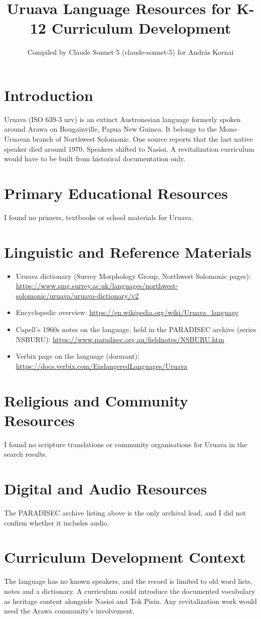 \documentclass[12pt]{article}
\title{Uruava Language Resources for K-12 Curriculum Development}
\author{Compiled by Claude Sonnet 5 (claude-sonnet-5) for Andr\'as Kornai}
\date{}
\begin{document}
\maketitle

\section{Introduction}
Uruava (ISO 639-3 urv) is an extinct Austronesian language formerly spoken around Arawa on Bougainville, Papua New Guinea. It belongs to the Mono--Uruavan branch of Northwest Solomonic. One source reports that the last native speaker died around 1970. Speakers shifted to Nasioi. A revitalization curriculum would have to be built from historical documentation only.

\section{Primary Educational Resources}
I found no primers, textbooks or school materials for Uruava.

\section{Linguistic and Reference Materials}
\begin{itemize}
\item Uruava dictionary (Surrey Morphology Group, Northwest Solomonic pages): \url{https://www.smg.surrey.ac.uk/languages/northwest-solomonic/uruava/uruava-dictionary/v2}
\item Encyclopedic overview: \url{https://en.wikipedia.org/wiki/Uruava_language}
\item Capell's 1960s notes on the language, held in the PARADISEC archive (series NSBURU): \url{https://www.paradisec.org.au/fieldnotes/NSBURU.htm}
\item Verbix page on the language (dormant): \url{https://docs.verbix.com/EndangeredLanguages/Uruava}
\end{itemize}

\section{Religious and Community Resources}
I found no scripture translations or community organisations for Uruava in the search results.

\section{Digital and Audio Resources}
The PARADISEC archive listing above is the only archival lead, and I did not confirm whether it includes audio.

\section{Curriculum Development Context}
The language has no known speakers, and the record is limited to old word lists, notes and a dictionary. A curriculum could introduce the documented vocabulary as heritage content alongside Nasioi and Tok Pisin. Any revitalization work would need the Arawa community's involvement.
\end{document}
